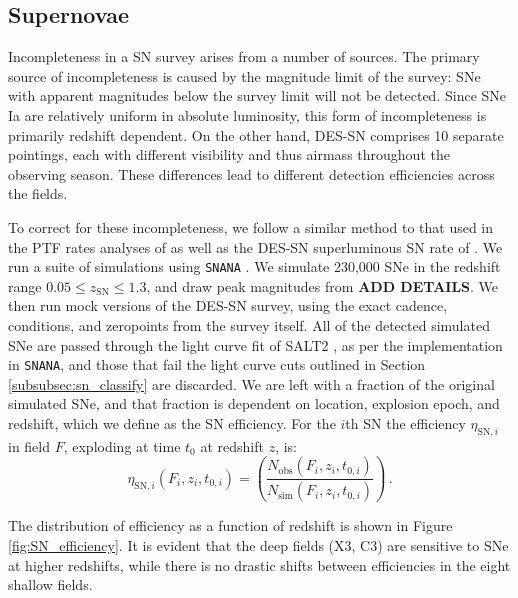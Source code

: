 \documentclass[fleqn,usenatbib]{mnras}
\begin{document}
\subsection{Supernovae \label{subsec:incompleteness_SNe}}

Incompleteness in a SN survey arises from a number of sources. The primary source of incompleteness is caused by the magnitude limit of the survey: SNe with apparent magnitudes below the survey limit will not be detected. Since SNe Ia are relatively uniform in absolute luminosity, this form of incompleteness is primarily redshift dependent. On the other hand, DES-SN comprises 10 separate pointings, each with different visibility and thus airmass throughout the observing season. These differences lead to different detection efficiencies across the fields.

To correct for these incompleteness, we follow a similar method to that used in the PTF rates analyses of \citet{Frohmaier2019,Frohmaier2020} as well as the DES-SN superluminous SN rate of \citet{Thomas2020}. We run a suite of simulations using \texttt{SNANA} \citet{Kessler2009a}. We simulate 230,000 SNe in the redshift range $0.05 \leq z_{\mathrm{SN}} \leq 1.3$, and draw peak magnitudes from \textbf{ADD DETAILS}. We then run mock versions of the DES-SN survey, using the exact cadence, conditions, and zeropoints from the survey itself. All of the detected simulated SNe are passed through the light curve fit of SALT2 \citep{Betoule2014}, as per the implementation in \texttt{SNANA}, and those that fail the light curve cuts outlined in Section \ref{subsubsec:sn_classify} are discarded. We are left with a fraction of the original simulated SNe, and that fraction is dependent on location, explosion epoch, and redshift, which we define as the SN efficiency. For the $i$th SN the efficiency $\eta_{\mathrm{SN}, i}$ in field $F$, exploding at time $t_0$ at redshift $z$, is:
\begin{equation}
    \eta_{\mathrm{SN},i} (F_i,z_i,t_{0,i}) = \left( \frac{N_{\mathrm{obs}}\left(F_i,z_i,t_{0,i}\right)}{N_{\mathrm{sim}}\left(F_i,z_i,t_{0,i}\right)}\right)\,.
\end{equation}

The distribution of efficiency as a function of redshift is shown in Figure \ref{fig:SN_efficiency}. It is evident that the deep fields (X3, C3) are sensitive to SNe at higher redshifts, while there is no drastic shifts between efficiencies in the eight shallow fields. 
\end{document}

